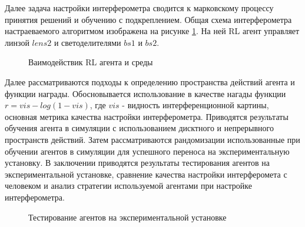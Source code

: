 Далее задача настройки интерферометра сводится к марковскому процессу принятия решений и обучению с подкреплением. Общая схема интерферометра настраеваемого алгоритмом изображена на рисунке \ref{fig:interf_scheme}. На ней RL агент управляет линзой $lens 2$ и светоделителями $bs1$ и $bs2$. 

\begin{figure}[ht]
    \caption{Ваимодействик RL агента и среды}\label{fig:interf_scheme}
\end{figure}

Далее рассматриваются подходы к определению пространства действий агента и функции награды. Обосновывается использование в качестве нагады функции $r = vis - log(1 - vis)$, где $vis$ - видность интерференционной картины, основная метрика качества настройки интерферометра. Приводятся результаты обучения агента в симуляции с использованием дисктного и непрерывного пространств действий. Затем рассматриваются рандомизации использованные при обучении агентов в симуляции для успешного переноса на экспериментальную установку. В заключении приводятся результаты тестирования агентов на экспериментальной установке, сравнение качества настройки интерферомета с человеком и анализ стратегии используемой агентами при настройке интерферометра. 

\begin{figure}[ht]
    \caption{Тестирование агентов на экспериментальной установке}\label{fig:interf_test}
\end{figure}

